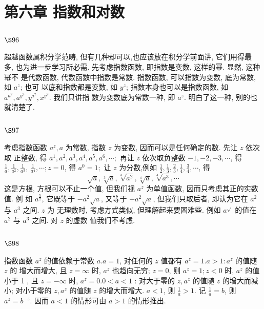 \chapter{第六章 指数和对数}

\section{$\S 96$}

超越函数属积分学范畴, 但有几种却可以,也应该放在积分学前面讲, 它们用得最 多, 也为进一步学习所必需. 先考虑指数函数, 即指数是变数, 这样的幂. 显然, 这种幂不 是代数函数, 代数函数中指数是常数. 指数函数, 可以指数为变数, 底为常数, 如 $a^{z}$; 也可 以底和指数都是变数, 如 $y^{z}$; 指数本身也可以是指数函数, 如 $a^{a^{2}}, a^{y^{2}}, y^{a^{2}}, x^{y^{2}}$. 我们只讲指 数为变数底为常数一种, 即 $a^{z}$. 明白了这一种, 别的也就清楚了.

\section{$\S 97$}

考虑指数函数 $a^{z}, a$ 为常数, 指数 $z$ 为变数, 因而可以是任何确定的数. 先让 $z$ 依次取 正整数, 得 $a^{1}, a^{2}, a^{3}, a^{4}, a^{5}, a^{6}, \cdots ;$ 再让 $z$ 依次取负整数 $-1,-2,-3, \cdots$, 得 $\frac{1}{a}, \frac{1}{a^{2}}, \frac{1}{a^{3}}$, $\frac{1}{a^{4}}, \cdots ; z=0$, 得 $a^{0}=1 ;$ 让 $z$ 为分数,例如 $\frac{1}{2}, \frac{1}{3}, \frac{2}{3}, \frac{1}{4}, \frac{3}{4}, \cdots$, 得
\[
\sqrt{a}, \sqrt[3]{a}, \sqrt[3]{a^{2}}, \sqrt[4]{a}, \sqrt[4]{a^{3}}, \cdots
\]
这是方根, 方根可以不止一个值, 但我们视 $a^{z}$ 为单值函数, 因而只考虑其正的实数值. 例 如 $a^{\frac{5}{2}}$, 它既等于 $-a^{2} \sqrt{a}$, 又等于 $+a^{2} \sqrt{a}$, 但我们只取后者, 即认为它在 $a^{2}$ 与 $a^{3}$ 之间. $z$ 为 无理数时, 考虑方式类似, 但理解起来要困难些. 例如 $a^{\sqrt{ }}$ 的值在 $a^{2}$ 与 $a^{3}$ 之间. 对 $z$ 的虚数 值我们不考虑.

\section{$\S 98$}

指数函数 $a^{z}$ 的值依赖于常数 $a . a=1$, 对任何的 $z$ 值都有 $a^{z}=1 . a>1: a^{z}$ 的值随 $z$ 的 增大而增大, 且 $z=\infty$ 时, $a^{z}$ 也趋向无穷; $z=0$, 则 $a^{z}=1 ; z<0$ 时, $a^{z}$ 的值小于 1 , 且 $z=-\infty$ 时, $a^{z}=0.0<a<1$ : 对大于零的 $z, a^{z}$ 的值随 $z$ 的增大而减小; 对小于零的 $z, a^{z}$ 的值随 $z$ 的增大而增大. $a<1$, 则 $\frac{1}{a}>1$. 记 $\frac{1}{a}=b$, 则 $a^{z}=b^{-z}$. 因而 $a<1$ 的情形可由 $a>1$ 的情形推出.

